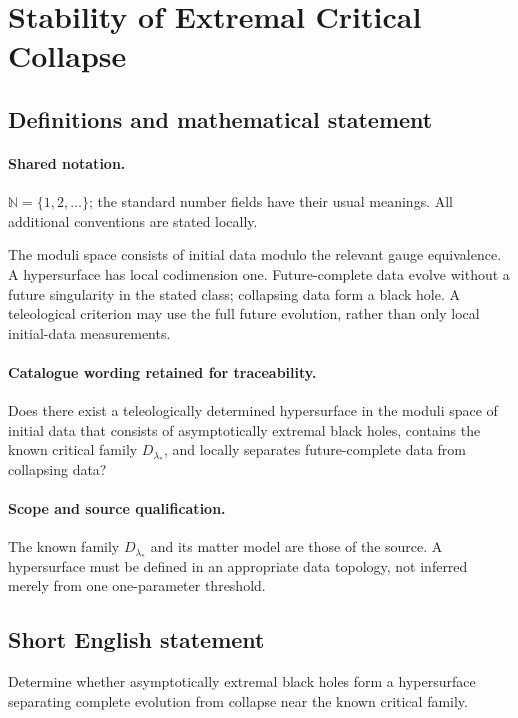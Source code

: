 \documentclass[11pt]{article}
\begin{document}
\section{Stability of Extremal Critical Collapse}\label{statement}

\subsection{Definitions and mathematical statement}

\paragraph{Shared notation.}$\mathbb N=\{1,2,\ldots\}$; the standard number fields have their usual meanings. All additional conventions are stated locally.


The moduli space consists of initial data modulo the relevant gauge equivalence. A hypersurface has local codimension one. Future-complete data evolve without a future singularity in the stated class; collapsing data form a black hole. A teleological criterion may use the full future evolution, rather than only local initial-data measurements.

\paragraph{Catalogue wording retained for traceability.}
Does there exist a teleologically determined hypersurface in the moduli space of initial data that consists of asymptotically extremal black holes, contains the known critical family $D_{\lambda_*}$, and locally separates future-complete data from collapsing data?

\paragraph{Scope and source qualification.}The known family $D_{\lambda_*}$ and its matter model are those of the source. A hypersurface must be defined in an appropriate data topology, not inferred merely from one one-parameter threshold.
\subsection{Short English statement}
Determine whether asymptotically extremal black holes form a hypersurface separating complete evolution from collapse near the known critical family.
\end{document}
